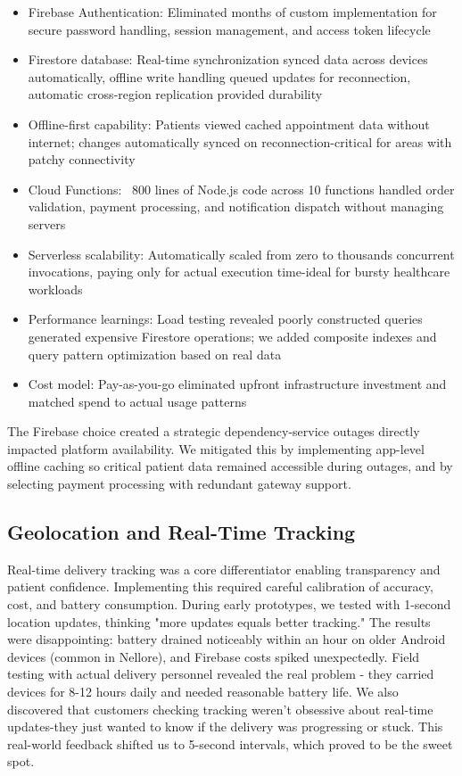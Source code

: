 \documentclass[12pt,a4paper]{report}
\begin{document}
\begin{itemize}
  \item Firebase Authentication: Eliminated months of custom implementation for secure password handling, session management, and access token lifecycle
  \item Firestore database: Real-time synchronization synced data across devices automatically, offline write handling queued updates for reconnection, automatic cross-region replication provided durability
  \item Offline-first capability: Patients viewed cached appointment data without internet; changes automatically synced on reconnection-critical for areas with patchy connectivity
  \item Cloud Functions: ~800 lines of Node.js code across 10 functions handled order validation, payment processing, and notification dispatch without managing servers
  \item Serverless scalability: Automatically scaled from zero to thousands concurrent invocations, paying only for actual execution time-ideal for bursty healthcare workloads
  \item Performance learnings: Load testing revealed poorly constructed queries generated expensive Firestore operations; we added composite indexes and query pattern optimization based on real data
  \item Cost model: Pay-as-you-go eliminated upfront infrastructure investment and matched spend to actual usage patterns
\end{itemize}

The Firebase choice created a strategic dependency-service outages directly impacted platform availability. We mitigated this by implementing app-level offline caching so critical patient data remained accessible during outages, and by selecting payment processing with redundant gateway support.

\subsection{Geolocation and Real-Time Tracking}

Real-time delivery tracking was a core differentiator enabling transparency and patient confidence. Implementing this required careful calibration of accuracy, cost, and battery consumption. During early prototypes, we tested with 1-second location updates, thinking "more updates equals better tracking." The results were disappointing: battery drained noticeably within an hour on older Android devices (common in Nellore), and Firebase costs spiked unexpectedly. Field testing with actual delivery personnel revealed the real problem - they carried devices for 8-12 hours daily and needed reasonable battery life. We also discovered that customers checking tracking weren't obsessive about real-time updates-they just wanted to know if the delivery was progressing or stuck. This real-world feedback shifted us to 5-second intervals, which proved to be the sweet spot.
\end{document}
